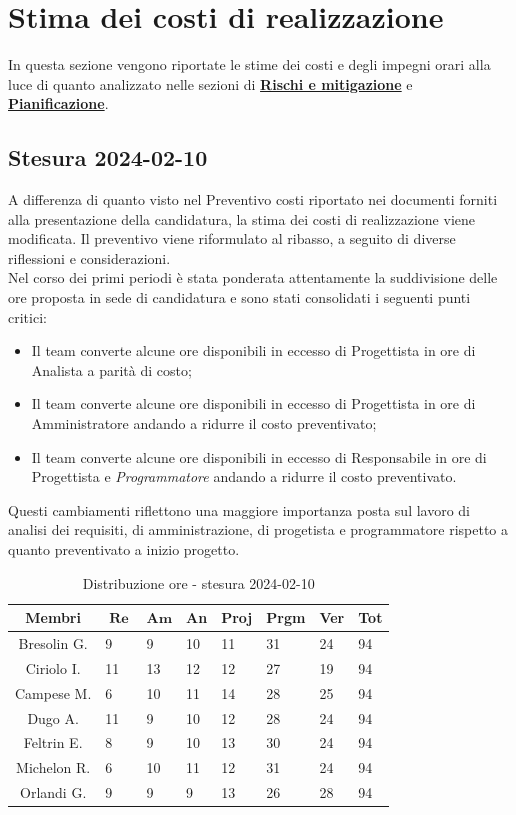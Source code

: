 \documentclass[10pt, a4paper]{article}
\begin{document}
\section{Stima dei costi di realizzazione}
In questa sezione vengono riportate le stime dei costi e degli impegni orari alla luce di quanto analizzato nelle sezioni di \hyperref[section:Rischi]{\textbf{Rischi e mitigazione}} e \hyperref[section:Pianificazione]{\textbf{Pianificazione}}.

\subsection{Stesura 2024-02-10}
A differenza di quanto visto nel Preventivo costi riportato nei documenti forniti alla presentazione della candidatura, la stima dei costi di realizzazione viene modificata. Il preventivo viene riformulato al ribasso, a seguito di diverse riflessioni e considerazioni. \\ Nel corso dei primi periodi è stata ponderata attentamente la suddivisione delle ore proposta in sede di candidatura e sono stati consolidati i seguenti punti critici:
\begin{itemize}
    \item Il team converte alcune ore disponibili in eccesso di Progettista in ore di Analista a parità di costo;
    \item Il team converte alcune ore disponibili in eccesso di Progettista in ore di Amministratore andando a ridurre il costo preventivato;
    \item Il team converte alcune ore disponibili in eccesso di Responsabile in ore di Progettista e \textit{Programmatore\pg} andando a ridurre il costo preventivato.
\end{itemize}
Questi cambiamenti riflettono una maggiore importanza posta sul lavoro di analisi dei requisiti, di amministrazione, di progetista e programmatore rispetto a quanto preventivato a inizio progetto.\\


\renewcommand{\arraystretch}{1.2}
\begin{table}[H]
\begin{tabularx}{\textwidth}{c|X|X|X|X|X|X|X}
        \textbf{Membri} & $\operatorname{\textbf{Re}}$ & $\mathrm{\textbf{Am}}$ & \textbf{An} & \textbf{Proj} & \textbf{Prgm} & \textbf{Ver} & \textbf{Tot} \\
        \hline Bresolin G. & 9 & 9 & 10 & 11 & 31 & 24 & 94 \\
        \hline Ciriolo I. & 11 & 13 & 12 & 12 & 27 & 19 & 94 \\
        \hline Campese M. & 6 & 10 & 11 & 14 & 28 & 25 & 94 \\
        \hline Dugo A.   & 11 & 9 & 10 & 12 & 28 & 24 & 94 \\
        \hline Feltrin E. & 8 & 9 & 10 & 13 & 30 & 24 & 94 \\
        \hline Michelon R. & 6 & 10 & 11 & 12 & 31 & 24 & 94 \\
        \hline Orlandi G. & 9 & 9 & 9 & 13 & 26 & 28 & 94 
    \end{tabularx}
    \caption{Distribuzione ore - stesura 2024-02-10}
    \end{table}
\end{document}
